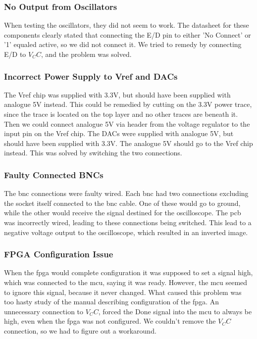 \subsubsection{No Output from Oscillators}
When testing the oscillators, they did not seem to work. The datasheet for these components clearly stated that connecting the E/D pin to either 'No Connect' or '1' equaled active, so we did not connect it. We tried to remedy by connecting E/D to \(V_CC\), and the problem was solved.

\subsubsection{Incorrect Power Supply to Vref and DACs}
The Vref chip was supplied with 3.3V, but should have been supplied with analogue 5V instead. This could be remedied by cutting on the 3.3V power trace, since the trace is located on the top layer and no other traces are beneath it. Then we could connect analogue 5V via header from the voltage regulator to the input pin on the Vref chip.
\newline
The DACs were supplied with analogue 5V, but should have been supplied with 3.3V. The analogue 5V should go to the Vref chip instead. This was solved by switching the two connections.

\subsubsection{Faulty Connected BNCs}
The \gls{bnc} connections were faulty wired. Each \gls{bnc} had two connections excluding the socket itself connected to the \gls{bnc} cable. One of these would go to ground, while the other would receive the signal destined for the oscilloscope. The \gls{pcb} was incorrectly wired, leading to these connections being switched. This lead to a negative voltage output to the oscilloscope, which resulted in an inverted image. 

\subsubsection{FPGA Configuration Issue}
When the \gls{fpga} would complete configuration it was supposed to set a signal high, which was connected to the \gls{mcu}, saying it was ready. However, the \gls{mcu} seemed to ignore this signal, because it never changed. What caused this problem was too hasty study of the manual describing configuration of the \gls{fpga}.
An unnecessary connection to \(V_CC\), forced the Done signal into the \gls{mcu} to always be high, even when the \gls{fpga} was not configured. We couldn't remove the \(V_CC\) connection, so we had to figure out a workaround.


